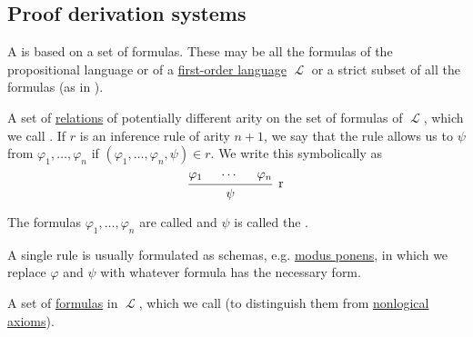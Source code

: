 \subsection{Proof derivation systems}\label{subsec:proof_derivation_systems}

\begin{definition}\label{def:proof_derivation_system}
  A  is based on a set of formulas. These may be all the formulas of the propositional language or of a \hyperref[def:first_order_syntax]{first-order language} \( \mscrL \) or a strict subset of all the formulas (as in ).

  \begin{thmenum}
     A set of \hyperref[def:relation]{relations} of potentially different arity on the set of formulas of \( \mscrL \), which we call . If \( r \) is an inference rule of arity \( n + 1 \), we say that the rule allows us to  \( \psi \) from \( \varphi_1, \ldots, \varphi_n \) if \( (\varphi_1, \ldots, \varphi_n, \psi) \in r \). We write this symbolically as
    \begin{equation*}
      \begin{prooftree}
        \hypo{\varphi_1}
        \hypo{\cdots}
        \hypo{\varphi_n}
        \infer3[r]{\psi}
      \end{prooftree}
    \end{equation*}

    The formulas \( \varphi_1, \ldots, \varphi_n \) are called  and \( \psi \) is called the .

    A single rule is usually formulated as schemas, e.g. \hyperref[eq:def:positive_implicational_propositional_derivation_system/rules/modus_ponens]{modus ponens}, in which we replace \( \varphi \) and \( \psi \) with whatever formula has the necessary form.

     A set of \hyperref[def:first_order_syntax]{formulas} in \( \mscrL \), which we call  (to distinguish them from \hyperref[def:derivation_system_derivability]{nonlogical axioms}).
  \end{thmenum}
\end{definition}

